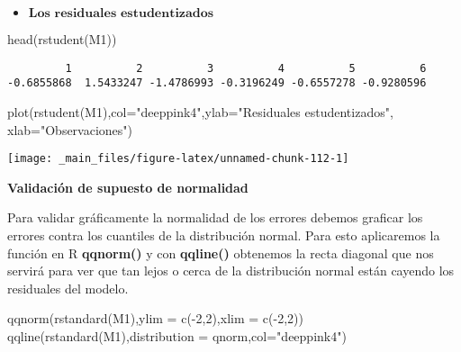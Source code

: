 \documentclass[
  a4paper,
  oneside,
  openany]{book}
\newenvironment{Shaded}{\begin{snugshade}}{\end{snugshade}}
\newcommand{\AttributeTok}[1]{\textcolor[rgb]{0.77,0.63,0.00}{#1}}
\newcommand{\DecValTok}[1]{\textcolor[rgb]{0.00,0.00,0.81}{#1}}
\newcommand{\FunctionTok}[1]{\textcolor[rgb]{0.00,0.00,0.00}{#1}}
\newcommand{\NormalTok}[1]{#1}
\newcommand{\SpecialCharTok}[1]{\textcolor[rgb]{0.00,0.00,0.00}{#1}}
\newcommand{\StringTok}[1]{\textcolor[rgb]{0.31,0.60,0.02}{#1}}
\providecommand{\tightlist}{%
  \setlength{\itemsep}{0pt}\setlength{\parskip}{0pt}}
\begin{document}
\begin{itemize}
\tightlist
\item
  \(\textbf{Los residuales estudentizados}\)
\end{itemize}

\begin{Shaded}
\begin{Highlighting}[]
\FunctionTok{head}\NormalTok{(}\FunctionTok{rstudent}\NormalTok{(M1))}
\end{Highlighting}
\end{Shaded}

\begin{verbatim}
         1          2          3          4          5          6 
-0.6855868  1.5433247 -1.4786993 -0.3196249 -0.6557278 -0.9280596 
\end{verbatim}

\begin{Shaded}
\begin{Highlighting}[]
\FunctionTok{plot}\NormalTok{(}\FunctionTok{rstudent}\NormalTok{(M1),}\AttributeTok{col=}\StringTok{"deeppink4"}\NormalTok{,}\AttributeTok{ylab=}\StringTok{"Residuales estudentizados"}\NormalTok{, }\AttributeTok{xlab=}\StringTok{"Observaciones"}\NormalTok{)}
\end{Highlighting}
\end{Shaded}

\begin{center}\texttt{[image: \_main\_files/figure-latex/unnamed-chunk-112-1]} \end{center}

\textbf{Validación de supuesto de normalidad}

Para validar gráficamente la normalidad de los errores debemos graficar los errores contra los cuantiles de la distribución normal. Para esto aplicaremos la función en R \textbf{qqnorm()} y con \textbf{qqline()} obtenemos la recta diagonal que nos servirá para ver que tan lejos o cerca de la distribución normal están cayendo los residuales del modelo.

\begin{Shaded}
\begin{Highlighting}[]
\FunctionTok{qqnorm}\NormalTok{(}\FunctionTok{rstandard}\NormalTok{(M1),}\AttributeTok{ylim =} \FunctionTok{c}\NormalTok{(}\SpecialCharTok{{-}}\DecValTok{2}\NormalTok{,}\DecValTok{2}\NormalTok{),}\AttributeTok{xlim =} \FunctionTok{c}\NormalTok{(}\SpecialCharTok{{-}}\DecValTok{2}\NormalTok{,}\DecValTok{2}\NormalTok{))}
\FunctionTok{qqline}\NormalTok{(}\FunctionTok{rstandard}\NormalTok{(M1),}\AttributeTok{distribution =}\NormalTok{ qnorm,}\AttributeTok{col=}\StringTok{"deeppink4"}\NormalTok{)}
\end{Highlighting}
\end{Shaded}
\end{document}
